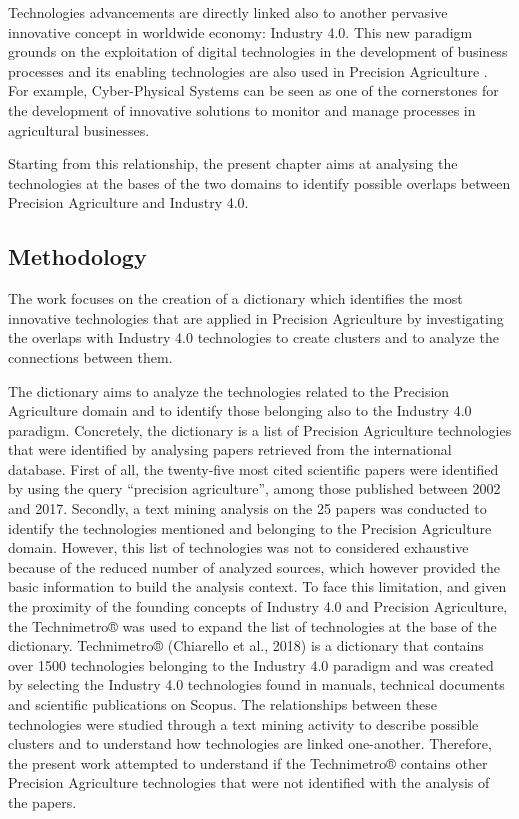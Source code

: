 \documentclass[]{book}
\begin{document}
Technologies advancements are directly linked also to another pervasive
innovative concept in worldwide economy: Industry 4.0. This new paradigm
grounds on the exploitation of digital technologies in the development
of business processes and its enabling technologies are also used in
Precision Agriculture . For example, Cyber-Physical Systems can be seen
as one of the cornerstones for the development of innovative solutions
to monitor and manage processes in agricultural businesses.

Starting from this relationship, the present chapter aims at analysing
the technologies at the bases of the two domains to identify possible
overlaps between Precision Agriculture and Industry 4.0.

\subsection{Methodology}\label{methodology-5}

The work focuses on the creation of a dictionary which identifies the
most innovative technologies that are applied in Precision Agriculture
by investigating the overlaps with Industry 4.0 technologies to create
clusters and to analyze the connections between them.

The dictionary aims to analyze the technologies related to the Precision
Agriculture domain and to identify those belonging also to the Industry
4.0 paradigm. Concretely, the dictionary is a list of Precision
Agriculture technologies that were identified by analysing papers
retrieved from the international database. First of all, the twenty-five
most cited scientific papers were identified by using the query
``precision agriculture'', among those published between 2002 and 2017.
Secondly, a text mining analysis on the 25 papers was conducted to
identify the technologies mentioned and belonging to the Precision
Agriculture domain. However, this list of technologies was not to
considered exhaustive because of the reduced number of analyzed sources,
which however provided the basic information to build the analysis
context. To face this limitation, and given the proximity of the
founding concepts of Industry 4.0 and Precision Agriculture, the
Technimetro® was used to expand the list of technologies at the base of
the dictionary. Technimetro® (Chiarello et al., 2018) is a dictionary
that contains over 1500 technologies belonging to the Industry 4.0
paradigm and was created by selecting the Industry 4.0 technologies
found in manuals, technical documents and scientific publications on
Scopus. The relationships between these technologies were studied
through a text mining activity to describe possible clusters and to
understand how technologies are linked one-another. Therefore, the
present work attempted to understand if the Technimetro® contains other
Precision Agriculture technologies that were not identified with the
analysis of the papers.
\end{document}
